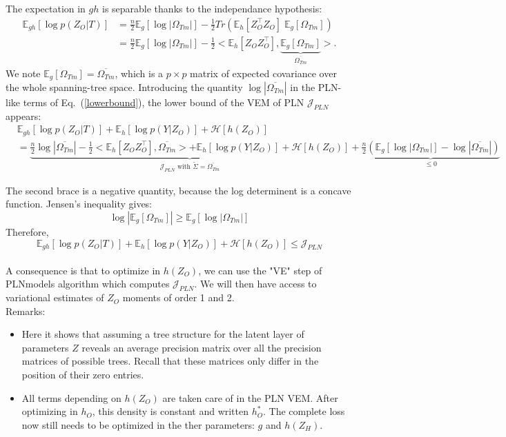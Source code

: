 \documentclass[11pt,a4paper]{article}
\newcommand{\Esp}{\mathds{E}}
\newcommand{\entr}{\mathcal{H}}
\begin{document}
The expectation in $gh$ is separable thanks to the independance hypothesis:
\begin{align*}
\Esp_{gh}[\log p(Z_O|T)] &=\frac{n}{2} \Esp_g [\log |\Omega_{Tm}|] - \frac{1}{2}  Tr\left(\Esp_h [Z_O^\intercal Z_O ]\; \Esp_g[\Omega_{Tm}]\right)\\
&=\frac{n}{2} \Esp_g [\log |\Omega_{Tm}|] - \frac{1}{2}<\Esp_h [Z_OZ_O^\intercal ], \underbrace{\Esp_g [\Omega_{Tm}]}_{\overline{\Omega_{Tm}}}> .
\end{align*}
We note $\Esp_g [\Omega_{Tm}] = \overline{\Omega_{Tm}}$, which is a $p\times p$ matrix of expected covariance over the whole spanning-tree space. Introducing the quantity  $\log |\overline{\Omega_{Tm}}| $ in the PLN-like terms of Eq.~(\ref{lowerbound}), the lower bound of the VEM of PLN $\mathcal{J}_{PLN}$ appears:
\begin{align*}
&\Esp_{gh}[\log p(Z_O | T)] +\Esp_h[\log p(Y|Z_O)]+ \entr[h(Z_O)]\\
& =\underbrace{\frac{n}{2} \log |\overline{\Omega_{Tm}}| - \frac{1}{2}<\Esp_h [Z_OZ_O^\intercal ], \overline{\Omega_{Tm}}> + \Esp_{h}[\log p(Y|Z_O)] + \entr[h(Z_O)]}_{\mathcal{J}_{PLN}\text{ with } \widetilde{\Sigma} = \overline{\Omega_{Tm}}} + \underbrace{\frac{n}{2}\left( \Esp_g[\log|\Omega_{Tm}|] - \log|\overline{\Omega_{Tm}}|\right)}_{\leq 0}
\end{align*}


The second brace is a negative quantity, because the log determinent is a concave function. Jensen's inequality gives:
$$\log |\Esp_g[\Omega_{Tm}]| \geq \Esp_g [\log |\Omega_{Tm}|]$$
Therefore, $$\Esp_{gh}[\log p(Z_O | T)] +\Esp_h[\log p(Y|Z_O)]+ \entr[h(Z_O)] \leq \mathcal{J}_{PLN}$$\\

A consequence is that to optimize in $h(Z_O)$, we can use the "VE" step of PLNmodels algorithm which computes $\mathcal{J}_{PLN}$. We will then have access to variational estimates of $Z_O$ moments of order 1 and 2.\\

Remarks:
\begin{itemize}
\item Here it shows that assuming a tree structure for the latent layer of parameters $Z$ reveals an average precision matrix over all the precision matrices of possible trees. Recall that these matrices only differ in the position of their zero entries.
\item All terms depending on $h(Z_O)$ are taken care of in the PLN VEM. After optimizing in $h_O$, this density is constant and written $h_O^*$. The complete loss now still needs to be optimized in the ther parameters: $g$ and $h(Z_H)$.
\end{itemize}
\end{document}
